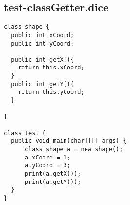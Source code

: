 \subsection{test-classGetter.dice}
\begin{verbatim}
class shape {
  public int xCoord;
  public int yCoord;

  public int getX(){
  	return this.xCoord;
  }
  public int getY(){
   	return this.yCoord;
  }

}

class test {
  public void main(char[][] args) {
      class shape a = new shape(); 
      a.xCoord = 1;
      a.yCoord = 3;
      print(a.getX());
      print(a.getY());
  }
}
\end{verbatim}
